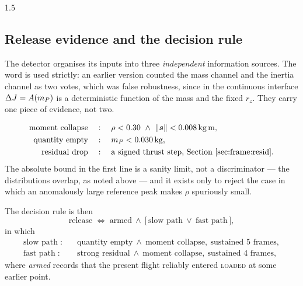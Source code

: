 \begin{spacing}{1.5}
\subsection{Release evidence and the decision rule}\label{sec:frame:decision}

The detector organises its inputs into three \emph{independent} information
sources. The word is used strictly: an earlier version counted the mass channel
and the inertia channel as two votes, which was false robustness, since in the
continuous interface $\Delta J=A(m_P)$ is a deterministic function of the mass and the
fixed $r_z$. They carry one piece of evidence, not two.

\begin{equation}
\begin{aligned}
\text{moment collapse}\quad&:\quad \rho < 0.30 \ \wedge\ \lVert\svec\rVert < \SI{0.008}{\kg\meter},\\
\text{quantity empty}\quad&:\quad \mP < \SI{0.030}{\kg},\\
\text{residual drop}\quad&:\quad \text{a signed thrust step, Section~\ref{sec:frame:resid}.}
\end{aligned}
\label{eq:release-evidence}
\end{equation}
The absolute bound in the first line is a sanity limit, not a discriminator ---
the distributions overlap, as noted above --- and it exists only to reject the
case in which an anomalously large reference peak makes $\rho$ spuriously small.

The decision rule is then
\begin{equation}
\text{release} \;\Longleftrightarrow\; \text{armed} \ \wedge\ \bigl[\, \text{slow path} \ \vee\ \text{fast path} \,\bigr],
\label{eq:releasedecision}
\end{equation}
in which
\begin{equation}
\begin{aligned}
\text{slow path}\;:\quad & \text{quantity empty} \ \wedge\ \text{moment collapse},
  \ \text{sustained } 5 \text{ frames},\\
\text{fast path}\;:\quad & \text{strong residual} \ \wedge\ \text{moment collapse},
  \ \text{sustained } 4 \text{ frames},
\end{aligned}
\label{eq:releasepaths}
\end{equation}
where \emph{armed} records that the present flight reliably entered
\textsc{loaded} at some earlier point.


\end{spacing}
